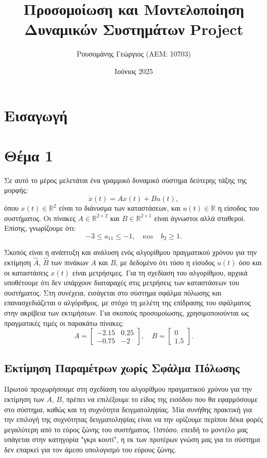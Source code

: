 \documentclass[a4paper,12pt]{article}
\title{Προσομοίωση και Μοντελοποίηση \newline Δυναμικών Συστημάτων \newline 
\selectlanguage{english}Project\selectlanguage{greek}}
\author{Ρουσομάνης Γεώργιος (ΑΕΜ: 10703)}
\date{Ιούνιος 2025}
\begin{document}
\maketitle

\section*{Εισαγωγή}

\section*{Θέμα 1}

Σε αυτό το μέρος μελετάται ένα γραμμικό δυναμικό σύστημα δεύτερης τάξης της μορφής:
\begin{equation}
\dot{x}(t) = A x(t) + B u(t),
\end{equation}
όπου $x(t) \in \mathbb{R}^2$ είναι το διάνυσμα των καταστάσεων, και $u(t) \in \mathbb{R}$ 
η είσοδος του συστήματος. Οι πίνακες $A \in \mathbb{R}^{2 \times 2}$ και 
$B \in \mathbb{R}^{2 \times 1}$ είναι άγνωστοι αλλά σταθεροί. Επίσης, γνωρίζουμε ότι:
\[
-3 \leq a_{11} \leq -1, \quad \text{και} \quad b_2 \geq 1.
\]

Σκοπός είναι η ανάπτυξη και ανάλυση ενός αλγορίθμου πραγματικού χρόνου για την εκτίμηση  
$\hat{A},\,\hat{B}$ των πινάκων $A$ και $B$, με δεδομένο ότι τόσο η είσοδος $u(t)$ όσο και  
οι καταστάσεις $x(t)$ είναι μετρήσιμες. Για τη σχεδίαση του αλγορίθμου, αρχικά υποθέτουμε ότι  
δεν υπάρχουν διαταραχές στις μετρήσεις των καταστάσεων του συστήματος. Στη συνέχεια,  
εισάγεται στο σύστημα σφάλμα πόλωσης και επανασχεδιάζεται ο αλγόριθμος, με στόχο  
τη μελέτη της επίδρασης του σφάλματος στην ακρίβεια των εκτιμήσεων. Για σκοπούς προσομοίωσης,  
χρησιμοποιούνται ως πραγματικές τιμές οι παρακάτω πίνακες:
\[
A = 
\begin{bmatrix}
-2.15 & 0.25 \\
-0.75 & -2
\end{bmatrix}, \quad
B = 
\begin{bmatrix}
0 \\
1.5
\end{bmatrix}.
\]

\subsection*{Εκτίμηση Παραμέτρων χωρίς Σφάλμα Πόλωσης}

Πρωτού προχωρήσουμε στη σχεδίαση του αλγορίθμου πραγματικού χρόνου για την εκτίμηση των $A,\,B$,  
πρέπει να επιλέξουμε το είδος της εισόδου που θα εφαρμόσουμε στο σύστημα, καθώς και τη συχνότητα  
δειγματοληψίας. Μία συνήθης πρακτική για την επιλογή της συχνότητας δειγματοληψίας είναι να την  
ορίζουμε περίπου δέκα φορές μεγαλύτερη από το εύρος ζώνης του συστήματος. Ωστόσο, επειδή το μοντέλο  
μας υπάγεται στην κατηγορία "γκρι κουτί", η εκ των προτέρων γνώση μας για το σύστημα δεν επαρκεί  
για τον άμεσο υπολογισμό του εύρους ζώνης.
\end{document}
